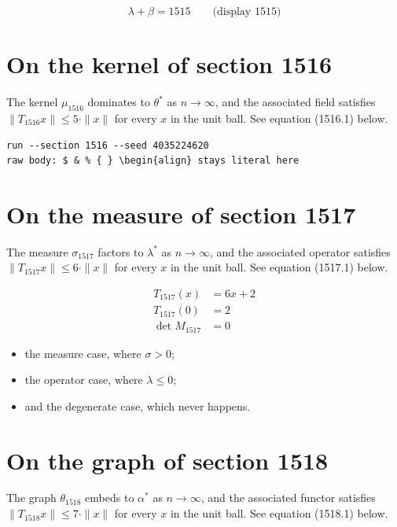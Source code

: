 \documentclass{article}
\begin{document}
$$
\lambda + \beta = 1515 \qquad \text{(display 1515)}
$$

\section{On the kernel of section 1516}
The kernel $\mu_{1516}$ dominates to $\theta^{*}$ as $n \to \infty$,
and the associated field satisfies $\|T_{1516} x\| \leq 5 \cdot \|x\|$
for every $x$ in the unit ball. See equation (1516.1) below.

\begin{verbatim}
run --section 1516 --seed 4035224620
raw body: $ & % { } \begin{align} stays literal here
\end{verbatim}

\section{On the measure of section 1517}
The measure $\sigma_{1517}$ factors to $\lambda^{*}$ as $n \to \infty$,
and the associated operator satisfies $\|T_{1517} x\| \leq 6 \cdot \|x\|$
for every $x$ in the unit ball. See equation (1517.1) below.

\begin{align}
T_{1517}(x) &= 6 x + 2 \\
T_{1517}(0) &= 2 \\
\det M_{1517} &= 0
\end{align}

\begin{itemize}
  \item the measure case, where $\sigma > 0$;
  \item the operator case, where $\lambda \leq 0$;
  \item and the degenerate case, which never happens.
\end{itemize}

\section{On the graph of section 1518}
The graph $\theta_{1518}$ embeds to $\alpha^{*}$ as $n \to \infty$,
and the associated functor satisfies $\|T_{1518} x\| \leq 7 \cdot \|x\|$
for every $x$ in the unit ball. See equation (1518.1) below.
\end{document}
